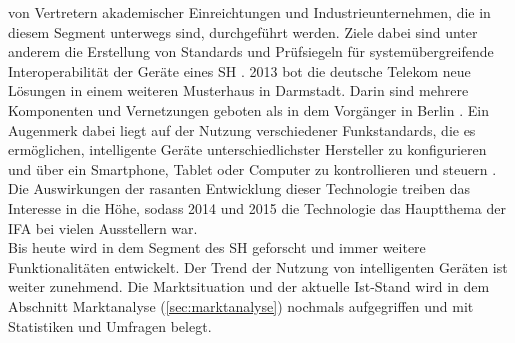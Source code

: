         von Vertretern akademischer Einreichtungen und Industrieunternehmen, die in diesem Segment unterwegs sind, 
        durchgeführt werden. Ziele dabei sind unter anderem die Erstellung von Standards und Prüfsiegeln für 
        systemübergreifende Interoperabilität der Geräte eines \acl{SH} \cite{vde-smartAndBuilding}. 
        2013 bot die deutsche Telekom neue Lösungen in einem weiteren Musterhaus in Darmstadt. 
        Darin sind mehrere Komponenten und Vernetzungen geboten als in dem Vorgänger in Berlin \cite{telekom_SH}. Ein 
        Augenmerk dabei liegt auf der Nutzung verschiedener Funkstandards, die es ermöglichen, intelligente Geräte 
        unterschiedlichster Hersteller zu konfigurieren und über ein Smartphone, Tablet oder Computer zu kontrollieren 
        und steuern \cite{telekom_SH}. Die Auswirkungen der rasanten Entwicklung dieser Technologie treiben das 
        Interesse in die Höhe, sodass 2014 und 2015 die Technologie das Hauptthema der \ac{IFA} bei vielen 
        Ausstellern war.
        \\
        Bis heute wird in dem Segment des \acl{SH} geforscht und immer weitere Funktionalitäten entwickelt. Der Trend 
        der Nutzung von intelligenten Geräten ist weiter zunehmend. Die Marktsituation und der aktuelle Ist-Stand 
        wird in dem Abschnitt Marktanalyse (\ref{sec:marktanalyse}) nochmals aufgegriffen und mit Statistiken und Umfragen belegt.

